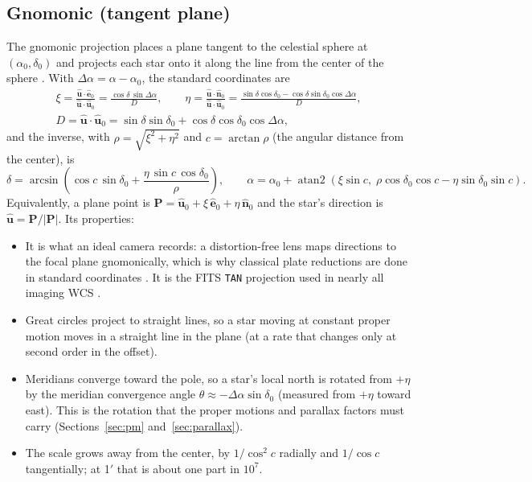 \documentclass[11pt]{article}
\newcommand{\code}[1]{\texttt{#1}}
\newcommand{\uvec}[1]{\hat{\mathbf #1}}
\begin{document}
\subsection{Gnomonic (tangent plane)}

The gnomonic projection places a plane tangent to the celestial sphere at
$(\alpha_0,\delta_0)$ and projects each star onto it along the line from the
center of the sphere \citep{Snyder1987}. With
$\Delta\alpha = \alpha-\alpha_0$, the standard coordinates
\citep{Green1985, Kovalevsky2004} are
\begin{equation}
\begin{gathered}
  \xi  = \frac{\uvec u\cdot\uvec e_0}{\uvec u\cdot\uvec u_0} = \frac{\cos\delta\,\sin\Delta\alpha}{D}, \qquad
  \eta = \frac{\uvec u\cdot\uvec n_0}{\uvec u\cdot\uvec u_0} = \frac{\sin\delta\cos\delta_0 - \cos\delta\sin\delta_0\cos\Delta\alpha}{D}, \\
  D = \uvec u\cdot\uvec u_0 = \sin\delta\sin\delta_0 + \cos\delta\cos\delta_0\cos\Delta\alpha ,
\end{gathered}
  \label{eq:gnom}
\end{equation}
and the inverse, with $\rho = \sqrt{\xi^2+\eta^2}$ and $c = \arctan\rho$ (the
angular distance from the center), is
\begin{equation}
  \delta = \arcsin\!\left(\cos c\,\sin\delta_0 + \frac{\eta\,\sin c\,\cos\delta_0}{\rho}\right), \qquad
  \alpha = \alpha_0 + \operatorname{atan2}\!\left(\xi\sin c,\; \rho\cos\delta_0\cos c - \eta\sin\delta_0\sin c\right).
  \label{eq:gnominv}
\end{equation}
Equivalently, a plane point is $\mathbf P = \uvec u_0 + \xi\,\uvec e_0 +
\eta\,\uvec n_0$ and the star's direction is $\uvec u = \mathbf P/|\mathbf P|$.
Its properties:
\begin{itemize}
  \item It is what an ideal camera records: a distortion-free lens maps
    directions to the focal plane gnomonically, which is why classical plate
    reductions are done in standard coordinates \citep{Green1985,
    Kovalevsky2004}. It is the FITS \code{TAN} projection used in nearly all
    imaging WCS \citep{Calabretta2002}.
  \item Great circles project to straight lines, so a star moving at
    constant proper motion moves in a straight line in the plane (at a rate
    that changes only at second order in the offset).
  \item Meridians converge toward the pole, so a star's local north is rotated
    from $+\eta$ by the meridian convergence angle
    $\theta \approx -\Delta\alpha\sin\delta_0$ (measured from $+\eta$ toward
    east). This is the rotation that the proper motions and parallax factors
    must carry (Sections~\ref{sec:pm} and~\ref{sec:parallax}).
  \item The scale grows away from the center, by $1/\cos^2 c$ radially and
    $1/\cos c$ tangentially; at 1$'$ that is about one part in $10^7$.
\end{itemize}
\end{document}
